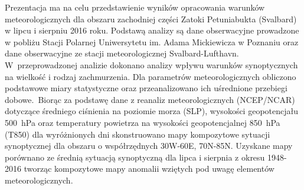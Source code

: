 \documentclass[\main/boa.tex]{subfiles}
\begin{document}
Prezentacja ma na celu przedstawienie wyników opracowania warunków meteorologicznych dla obszaru zachodniej części Zatoki Petuniabukta (Svalbard) w lipcu 
i sierpniu 2016 roku. Podstawą analizy są dane obserwacyjne prowadzone w pobliżu Stacji Polarnej Uniwersytetu im. Adama Mickiewicza w Poznaniu oraz dane obserwacyjne ze stacji meteorologicznej Svalbard-Lufthavn. W~przeprowadzonej analizie dokonano analizy wpływu warunków synoptycznych na wielkość i rodzaj zachmurzenia. Dla parametrów meteorologicznych obliczono podstawowe miary statystyczne oraz przeanalizowano ich uśrednione przebiegi dobowe. Biorąc za podstawę dane z reanaliz meteorologicznych (NCEP/NCAR) dotyczące średniego ciśnienia na poziomie morza (SLP), wysokości geopotencjału 500~hPa oraz temperatury powietrza na wysokości geopotencjalnej 850~hPa (T850) dla wyróżnionych dni skonstruowano mapy kompozytowe sytuacji synoptycznej dla obszaru o współrzędnych 30W-60E, 70N-85N. Uzyskane mapy porównano ze średnią sytuacją synoptyczną dla lipca i sierpnia z okresu 1948-2016 tworząc kompozytowe mapy anomalii wziętych pod uwagę elementów meteorologicznych.
\end{document}
